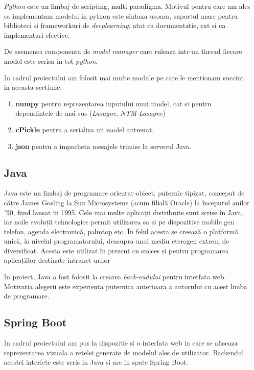 \documentclass[12pt]{article}
\begin{document}
\textit{Python} este un limbaj de scripting, multi paradigma. Motivul pentru care am ales sa implementam modelul in python este sintaxa usoara, suportul mare pentru biblioteci si frameworkuri de \textit{deeplearning}, atat ca documentatie, cat si ca implementari efective. 

De asemenea componenta de \textit{model manager} care ruleaza intr-un thread fiecare model este scrisa in tot \textit{python}.

In cadrul proiectului am folosit mai multe module pe care le mentionam succint in aceasta sectiune:
\begin{enumerate}
	\item \textbf{numpy} pentru reprezentarea inputului unui model, cat si pentru dependintele de mai sus (\textit{Lasagne}, \textit{NTM-Lasagne})
	\item \textbf{cPickle} pentru a serializa un model antrenat.
	\item \textbf{json} pentru a impacheta mesajele trimise la serverul Java.
\end{enumerate}


\subsection{Java}

Java este un limbaj de programare orientat-obiect, puternic tipizat, conceput de către James Gosling la Sun Microsystems (acum filială Oracle) la începutul anilor ʼ90, fiind lansat în 1995. Cele mai multe aplicații distribuite sunt scrise în Java, iar noile evoluții tehnologice permit utilizarea sa și pe dispozitive mobile gen telefon, agenda electronică, palmtop etc. În felul acesta se creează o platformă unică, la nivelul programatorului, deasupra unui mediu eterogen extrem de diversificat. Acesta este utilizat în prezent cu succes și pentru programarea aplicațiilor destinate intranet-urilor

In proiect, Java a fost folosit la crearea \textit{back-endului} pentru interfata web. Motivatia alegerii este experienta puternica anterioara a autorului cu acest limba de programare.

\subsection{Spring Boot}

In cadrul proiectului am pus la dispozitie si o interfata web in care se afiseaza reprezentarea vizuala a retelei generate de modelul ales de utilizator. Backendul acestei interfete este scris in Java si are in spate Spring Boot.
\end{document}
